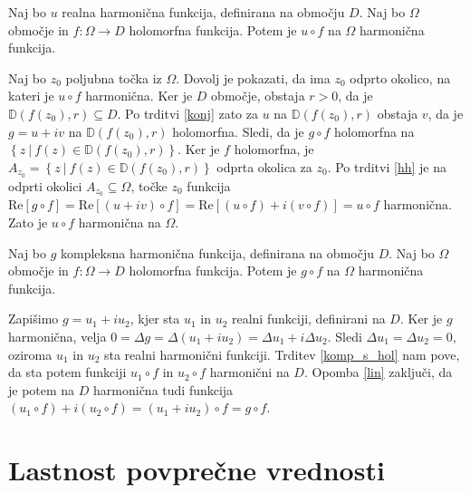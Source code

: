 \documentclass[mat1, tisk]{fmfdelo}
\begin{document}
    \begin{trditev}
        \label{komp_s_hol}
        Naj bo $u$ realna harmonična funkcija, definirana na območju $D$. Naj bo $\Omega$ območje in $f : \Omega \to D$ holomorfna funkcija. Potem je $u \circ f$ na $\Omega$ harmonična funkcija.
    \end{trditev}
    \begin{dokaz}
        Naj bo $z_0$ poljubna točka iz $\Omega$. Dovolj je pokazati, da ima $z_0$ odprto okolico, na kateri je $u \circ f$ harmonična. Ker je $D$ območje, obstaja $r > 0$, da je \mbox{$\mathbb{D}(f(z_0), r) \subseteq D$}. 
        Po trditvi \ref{konj} zato za $u$ na $\mathbb{D}(f(z_0),r)$ obstaja $v$, da je $g = u + iv$ na $\mathbb{D}(f(z_0), r)$ holomorfna. Sledi, da je $g \circ f$ holomorfna na $\left\{z~|~ f(z) \in \mathbb{D}(f(z_0), r)\right\}$.
        Ker je $f$ holomorfna, je $A_{z_0} = \left\{z~|~ f(z) \in \mathbb{D}(f(z_0), r)\right\}$ odprta okolica za $z_0$. Po trditvi \ref{hh} je na odprti okolici $A_{z_0} \subseteq \Omega$, točke $z_0$ funkcija $\text{Re}[g \circ f] = \text{Re}[(u + iv)\circ f] = \text{Re}[(u \circ f) + i(v \circ f)] = u \circ f$ harmonična. 
        Zato je $u \circ f$ harmonična na $\Omega$.
    \end{dokaz}

    \begin{posledica}
        \label{komp_s_hol_komp}
        Naj bo $g$ kompleksna harmonična funkcija, definirana na območju $D$. Naj bo $\Omega$ območje in $f : \Omega \to D$ holomorfna funkcija. Potem je $g \circ f$ na $\Omega$ harmonična funkcija.
    \end{posledica}
    \begin{dokaz}
        Zapišimo $g = u_1 + i u_2$, kjer sta $u_1$ in $u_2$ realni funkciji, definirani na $D$. 
        Ker je $g$ harmonična, velja $ 0 = \Delta g = \Delta(u_1 + i u_2) = \Delta u_1 + i \Delta u_2$. Sledi $\Delta u_1 = \Delta u_2 = 0$, oziroma $u_1$ in $u_2$ sta realni harmonični funkciji.
        Trditev \ref{komp_s_hol} nam pove, da sta potem funkciji $u_1 \circ f$ in $u_2 \circ f$ harmonični na $D$. Opomba \ref{lin} zaključi, da je potem na $D$ harmonična tudi funkcija $(u_1 \circ f) + i (u_2 \circ f) = (u_1 + i u_2) \circ f = g \circ f$.
    \end{dokaz}

\section{Lastnost povprečne vrednosti}
\end{document}
